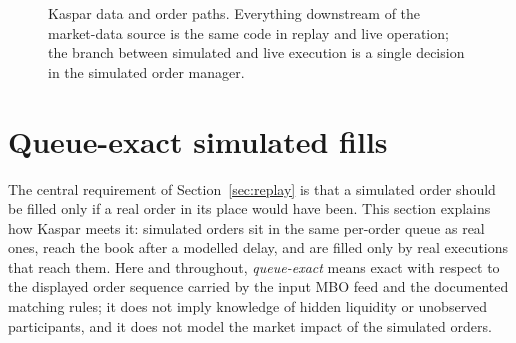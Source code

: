 \begin{figure}[ht]
\centering
{}
\caption{Kaspar data and order paths. Everything downstream of the market-data source is the same
code in replay and live operation; the branch between simulated and live execution is a single
decision in the simulated order manager.}
\label{fig:kaspar}
\end{figure}

\section{Queue-exact simulated fills}
\label{sec:kaspar-fills}

The central requirement of Section~\ref{sec:replay} is that a simulated order should be filled only if
a real order in its place would have been. This section explains how Kaspar meets it: simulated
orders sit in the same per-order queue as real ones, reach the book after a modelled delay, and are
filled only by real executions that reach them. Here and throughout, \emph{queue-exact} means exact
with respect to the displayed order sequence carried by the input MBO feed and the documented matching
rules; it does not imply knowledge of hidden liquidity or unobserved participants, and it does not model
the market impact of the simulated orders.

